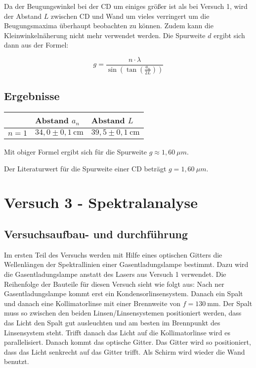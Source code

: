         Da der Beugungswinkel bei der CD um einiges größer ist als bei Versuch 1, wird der Abstand $L$ zwischen CD und Wand um vieles verringert um die Beugungsmaxima überhaupt beobachten zu können. Zudem kann die Kleinwinkelnäherung nicht mehr verwendet werden. Die Spurweite $d$ ergibt sich dann aus der Formel:

        $$g = \frac{n \cdot \lambda}{\sin(\tan(\frac{a_{n}}{2 L}))}$$

    \subsection{Ergebnisse}
        
        \begin{table}[H]
            \centering
            \begin{tabular}{|l|l|l|}
                \hline
                & Abstand $a_{n}$ & Abstand $L$\\
                \hline
                $n = 1$ & $34,0 \pm 0,1\ \mathrm{cm}$ & $39,5 \pm 0,1\ \mathrm{cm}$\\
                \hline
            \end{tabular}
        \end{table}

        Mit obiger Formel ergibt sich für die Spurweite $g \approx 1,60\ \mu m$.

        Der Literaturwert für die Spurweite einer CD beträgt $g = 1,60\ \mu m$.

\section{Versuch 3 - Spektralanalyse}
    
    \subsection{Versuchsaufbau- und durchführung}
        
        Im ersten Teil des Versuchs werden mit Hilfe eines optischen Gitters die Wellenlängen der Spektrallinien einer Gasentladungslampe bestimmt. Dazu wird die Gasentladungslampe anstatt des Lasers aus Versuch 1 verwendet. Die Reihenfolge der Bauteile für diesen Versuch sieht wie folgt aus:
        Nach ner Gasentladungslampe kommt erst ein Kondensorlinsensystem. Danach ein Spalt und danach eine Kollimatorlinse mit einer Brennweite von $f = 130\ \mathrm{mm}$. Der Spalt muss so zwischen den beiden Linsen/Linsensystemen positioniert werden, dass das Licht den Spalt gut ausleuchten und am besten im Brennpunkt des Linsensystem steht. Trifft danach das Licht auf die Kollimatorlinse wird es parallelisiert. Danach kommt das optische Gitter. Das Gitter wird so positioniert, dass das Licht senkrecht auf das Gitter trifft. Als Schirm wird wieder die Wand benutzt.

